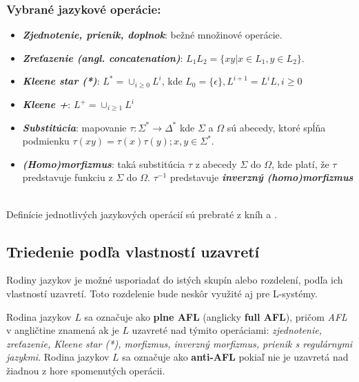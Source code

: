 \subsubsection*{Vybrané jazykové operácie:}
\label{closureOperations}

\begin{itemize}
    \itemsep0.2em 
    \item[] \textit{\textbf{Zjednotenie, prienik, doplnok}}: bežné množinové operácie.
    \item[] \textit{\textbf{Zreťazenie (angl. concatenation)}}: $L_1L_2 = \{xy | x \in L_1, y \in L_2 \}$.
    \item[] \textit{\textbf{Kleene star (*)}}: $L^* = \cup_{i\geq0}L^i$, kde $L_0 = \{\epsilon\}, L^{i+1} = L^iL, i \geq 0$
    \item[] \textit{\textbf{Kleene +}}: $L^+ = \cup_{i \geq 1}L^i$
    \item[] \textit{\textbf{Substitúcia}}: mapovanie $\tau: \Sigma^* \to \Delta^*$ kde $\Sigma$ a $\Omega$ sú abecedy, ktoré spĺňa podmienku $\tau(xy) = \tau(x)\tau(y); x,y \in \Sigma^*$.
    \item[] \textit{\textbf{(Homo)morfizmus}}: taká substitúcia $\tau$ z abecedy $\Sigma$ do $\Omega$, kde platí, že $\tau$ predstavuje funkciu z $\Sigma$ do $\Omega$. $\tau^{-1}$ predstavuje \textit{\textbf{inverzný (homo)morfizmus}}

\end{itemize}
\hfill\\

Definície jednotlivých jazykových operácií sú prebraté z kníh \cite{handbook} a \cite{medunaBase}.


\subsection*{Triedenie podľa vlastností uzavretí}
Rodiny jazykov je možné usporiadať do istých skupín alebo rozdelení, podľa ich vlastností uzavretí. Toto rozdelenie bude neskôr využité aj pre L-systémy.

\begin{definition}
\label{AFLDefinition}
Rodina jazykov $L$ sa označuje ako \textbf{plne AFL} (anglicky \textbf{full AFL}), pričom \textit{AFL} v angličtine znamená  ak je $L$ uzavreté nad týmito operáciami: \textit{zjednotenie, zreťazenie, Kleene star (*), morfizmus, inverzný morfizmus, prienik s regulárnymi jazykmi}. Rodina jazykov $L$ sa označuje ako \textbf{anti-AFL} pokiaľ nie je uzavretá nad žiadnou z hore spomenutých operácii.

\end{definition}
\hfill\\


